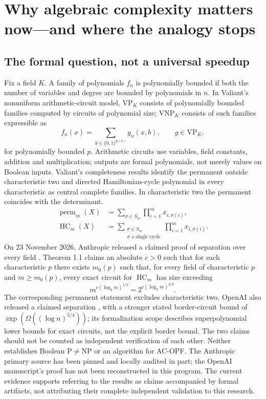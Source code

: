 \documentclass[11pt,letterpaper]{article}
\begin{document}
\section{Why algebraic complexity matters now---and where the analogy stops}
\label{sec:complexity}
\subsection{The formal question, not a universal speedup}
Fix a field $K$. A family of polynomials $f_n$ is polynomially bounded if both the number of variables and degree are bounded by polynomials in $n$. In Valiant's nonuniform arithmetic-circuit model, $\mathrm{VP}_K$ consists of polynomially bounded families computed by circuits of polynomial size; $\mathrm{VNP}_K$ consists of such families expressible as
\[
 f_n(x)=\sum_{b\in\{0,1\}^{p(n)}}g_n(x,b),\qquad g\in\mathrm{VP}_K,
\]
for polynomially bounded $p$. Arithmetic circuits use variables, field constants, addition and multiplication; outputs are formal polynomials, not merely values on Boolean inputs. Valiant's completeness results \cite{valiant} identify the permanent outside characteristic two and directed Hamiltonian-cycle polynomial in every characteristic as central complete families. In characteristic two the permanent coincides with the determinant.
\begin{align*}
\operatorname{perm}_m(X)&=\sum_{\sigma\in S_m}\prod_{i=1}^m x_{i,\sigma(i)},\\
\operatorname{HC}_m(X)&=\sum_{\substack{\sigma\in S_m\\\sigma\text{ a single cycle}}}\prod_{i=1}^m x_{i,\sigma(i)}.
\end{align*}
On 23 November 2026, Anthropic released a claimed proof of separation over every field \cite{anthropic}. Theorem 1.1 claims an absolute $c>0$ such that for each characteristic $p$ there exists $m_0(p)$ such that, for every field of characteristic $p$ and $m\ge m_0(p)$, every exact circuit for $\operatorname{HC}_m$ has size exceeding
\[
 m^{c(\log_2 m)^{1/3}}=2^{c(\log_2 m)^{4/3}}.
\]
The corresponding permanent statement excludes characteristic two. OpenAI also released a claimed separation \cite{openai}, with a stronger stated border-circuit bound of $\exp(\Omega((\log n)^{5/4}))$; its formalization scope describes superpolynomial lower bounds for exact circuits, not the explicit border bound. The two claims should not be counted as independent verification of each other. Neither establishes Boolean $\mathrm P\ne\mathrm{NP}$ or an algorithm for AC-OPF. The Anthropic primary source has been pinned and locally audited in part; the OpenAI manuscript's proof has not been reconstructed in this program. The current evidence supports referring to the results as claims accompanied by formal artifacts, not attributing their complete independent validation to this research.
\end{document}
